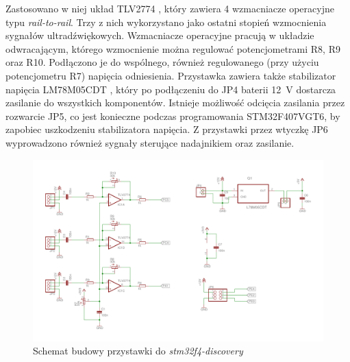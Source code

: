 Zastosowano w niej układ TLV2774 \cite{bib:TLV2774}, który zawiera 4 wzmacniacze operacyjne typu
\textit{rail-to-rail}. Trzy z nich wykorzystano jako ostatni stopień wzmocnienia sygnałów ultradźwiękowych. 
Wzmacniacze operacyjne pracują w układzie odwracającym, którego wzmocnienie można regulować potencjometrami R8, R9 oraz R10. 
Podłączono je do wspólnego, również regulowanego (przy użyciu potencjometru R7) napięcia odniesienia.
Przystawka zawiera także stabilizator napięcia LM78M05CDT \cite{bib:LM78M05CDT}, który po podłączeniu 
do JP4 baterii \SI{12}{V} dostarcza zasilanie do wszystkich komponentów. 
Istnieje możliwość odcięcia zasilania przez rozwarcie JP5, co jest konieczne podczas programowania
STM32F407VGT6, by zapobiec uszkodzeniu stabilizatora napięcia.
Z przystawki przez wtyczkę JP6 wyprowadzono również sygnały sterujące nadajnikiem oraz zasilanie.

 \begin{figure}[h]
    \centering
    \includegraphics[width=1\textwidth, trim= 5mm 0mm 0mm 0mm,clip]{mainboard2}
    \caption{Schemat budowy przystawki do \textit{stm32f4-discovery}}
    \label{fig:przystawka}
\end{figure}


